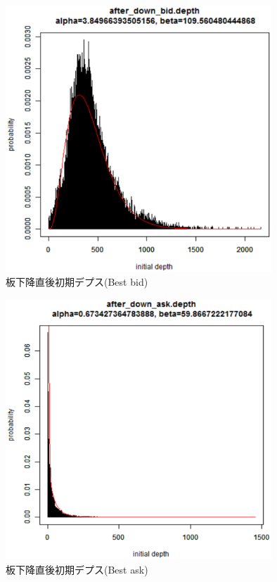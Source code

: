 \documentclass[a4j,papersize,disablejfam,slide,14pt]{jsarticle}
\begin{document}
    \begin{figure}[H]
        \begin{center}
    	\includegraphics[clip,width = 10.0cm]{graphics/after_down_bid.depth.eps}
        \end{center}
        \caption{板下降直後初期デプス({\rm Best bid})}
    \end{figure}
    \begin{figure}[H]
        \begin{center}
    	\includegraphics[clip,width = 10.0cm]{graphics/after_down_ask.depth.eps}
        \end{center}
        \caption{板下降直後初期デプス({\rm Best ask})}
    \end{figure}
    
\end{document}
